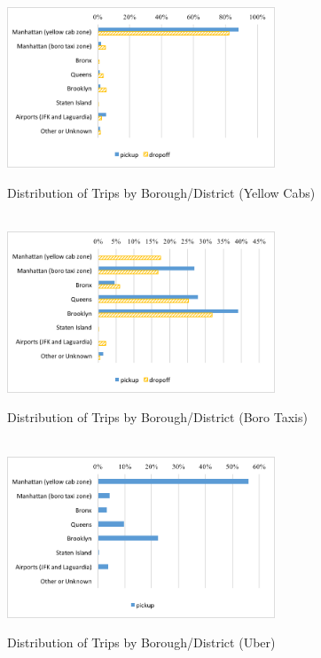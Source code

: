 \begin{figure}[h]
\centering
\caption{Distribution of Trips by Borough/District (Yellow Cabs)}\label{fig:pickdrop_yellow}\\
\vspace{0.2cm}
\includegraphics[width=8cm]{Figures/pickdrop_yellow.png}
\end{figure}

\begin{figure}[h]
\centering
\caption{Distribution of Trips by Borough/District (Boro Taxis)}\label{pickdrop_boro}\\
\vspace{0.2cm}
\includegraphics[width=8cm]{Figures/pickdrop_boro.png}
\end{figure}

\begin{figure}[h]
\centering
\caption{Distribution of Trips by Borough/District (Uber)}\label{fig:pickdrop_uber}\\
\vspace{0.2cm}
\includegraphics[width=8cm]{Figures/pickdrop_uber.png}
\end{figure}